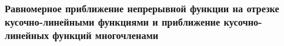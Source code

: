 \subsubsection{Равномерное приближение непрерывной функции на отрезке кусочно-линейными функциями и приближение кусочно-линейных функций многочленами}
